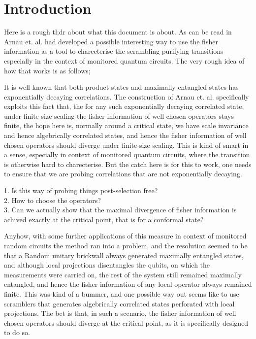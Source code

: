 \section{Introduction}

Here is a rough tl;dr about what this document is about. As can be read in \cite{Arnau2025MultipartiteEntanglementPhysRevLett} Arnau et. al. had developed a possible interesting way to use the fisher information as a tool to charecterise the scrambling-purifying transitions especially in the context of monitored quantum circuits. The very rough idea of how that works is as follows; 

It is well known that both product states and maximally entangled states has exponentially decaying correlations. The construction of Arnau et. al. specifically exploits this fact that, the for any such exponentially decaying correlated state, under finite-size scaling the fisher information of well chosen operators stays finite, the hope here is, normally around a critical state, we have scale invariance and hence algebrically correlated states, and hence the fisher information of well chosen operators should diverge under finite-size scaling. This is kind of smart in a sense, especially in context of monitored quantum circuits, where the transition is otherwise hard to charecterise. But the catch here is for this to work, one needs to ensure that we are probing correlations that are not exponentially decaying.


\begin{notes}[Questions:]    
1. Is this way of probing things post-selection free?\\
2. How to choose the operators?\\
3. Can we actually show that the maximal divergence of fisher information is achived exactly at the critical point, that is for a conformal state?
\end{notes}

Anyhow, with some further applications of this measure in context of monitored random circuits the method ran into a problem, and the resolution seemed to be that a Random unitary brickwall always generated maximally entangled states, and although local projections disentangles the qubits, on which the measurements were carried on, the rest of the system still remained maximally entangled, and hence the fisher information of any local operator always remained finite. This was kind of a bummer, and one possible way out seems like to use scramblers that generates algebrically correlated states perforated with local projections. The bet is that, in such a scenario, the fisher information of well chosen operators should diverge at the critical point, as it is specifically designed to do so.

